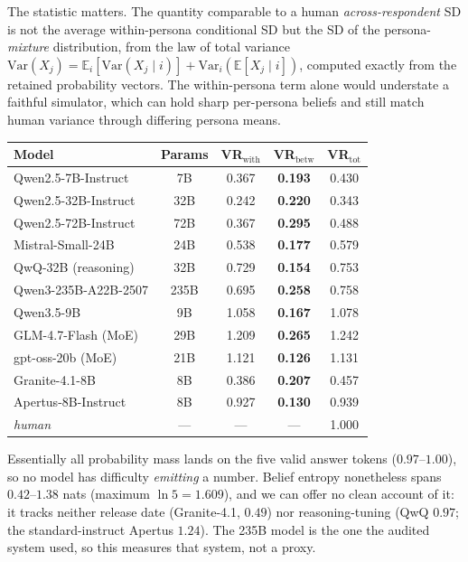 \documentclass[11pt]{article}
\begin{document}
The statistic matters. The quantity comparable to a human
\emph{across-respondent} SD is not the average within-persona conditional SD but
the SD of the persona-\emph{mixture} distribution, from the law of total
variance $\mathrm{Var}(X_j)=\mathbb{E}_i[\mathrm{Var}(X_j\mid i)]
+\mathrm{Var}_i(\mathbb{E}[X_j\mid i])$, computed exactly from the retained
probability vectors. The within-persona term alone would understate a faithful
simulator, which can hold sharp per-persona beliefs and still match human
variance through differing persona means.

\begin{center}\scriptsize
\setlength{\tabcolsep}{2.5pt}
\begin{tabular}{lcccc}
\toprule
Model & Params & VR$_\text{with}$ & VR$_\text{betw}$ & VR$_\text{tot}$\\
\midrule
Qwen2.5-7B-Instruct & 7B & 0.367 & \textbf{0.193} & 0.430\\
Qwen2.5-32B-Instruct & 32B & 0.242 & \textbf{0.220} & 0.343\\
Qwen2.5-72B-Instruct & 72B & 0.367 & \textbf{0.295} & 0.488\\
Mistral-Small-24B & 24B & 0.538 & \textbf{0.177} & 0.579\\
QwQ-32B (reasoning) & 32B & 0.729 & \textbf{0.154} & 0.753\\
Qwen3-235B-A22B-2507 & 235B & 0.695 & \textbf{0.258} & 0.758\\
Qwen3.5-9B & 9B & 1.058 & \textbf{0.167} & 1.078\\
GLM-4.7-Flash (MoE) & 29B & 1.209 & \textbf{0.265} & 1.242\\
gpt-oss-20b (MoE) & 21B & 1.121 & \textbf{0.126} & 1.131\\
Granite-4.1-8B & 8B & 0.386 & \textbf{0.207} & 0.457\\
Apertus-8B-Instruct & 8B & 0.927 & \textbf{0.130} & 0.939\\
\midrule
\textit{human} & --- & --- & --- & 1.000\\
\bottomrule
\end{tabular}
\end{center}

Essentially all probability mass lands on the five valid answer tokens
($0.97$--$1.00$), so no model has difficulty \emph{emitting} a number. Belief
entropy nonetheless spans $0.42$--$1.38$ nats (maximum $\ln 5 = 1.609$), and we
can offer no clean account of it: it tracks neither release date (Granite-4.1,
$0.49$) nor reasoning-tuning (QwQ $0.97$; the standard-instruct Apertus $1.24$).
The 235B model is the one the audited system used, so this measures that system,
not a proxy.
\end{document}
